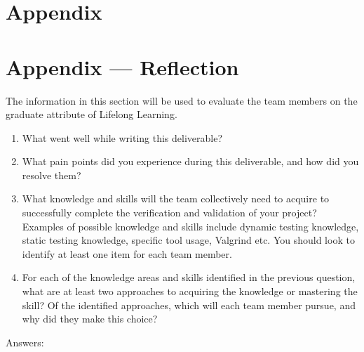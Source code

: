 \documentclass[12pt, titlepage]{article}
\begin{document}
\newpage

\section{Appendix}

\section*{Appendix --- Reflection}


The information in this section will be used to evaluate the team members on the
graduate attribute of Lifelong Learning.



\begin{enumerate}
  \item What went well while writing this deliverable? 
  \item What pain points did you experience during this deliverable, and how
    did you resolve them?
  \item What knowledge and skills will the team collectively need to acquire to
  successfully complete the verification and validation of your project?
  Examples of possible knowledge and skills include dynamic testing knowledge,
  static testing knowledge, specific tool usage, Valgrind etc.  You should look to
  identify at least one item for each team member.
  \item For each of the knowledge areas and skills identified in the previous
  question, what are at least two approaches to acquiring the knowledge or
  mastering the skill?  Of the identified approaches, which will each team
  member pursue, and why did they make this choice?
\end{enumerate}
Answers:
\end{document}

